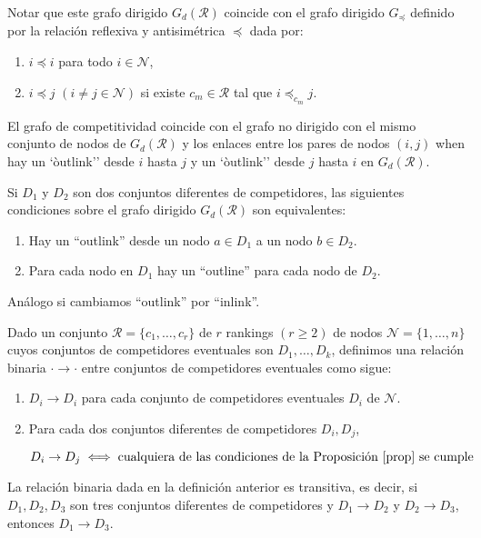 \begin{nota}
Notar que este grafo dirigido $G_d(\mathcal{R})$ coincide con el grafo dirigido $G_\preceq$ definido por la relación reflexiva y antisimétrica $\preceq$ dada por:
\begin{enumerate}
\item $i \preceq i$ para todo $i \in \mathcal{N}$,
\item $i \preceq j$ $(i\neq j \in \mathcal{N})$ si existe $c_m \in \mathcal{R}$ tal que $i \preceq_{c_m} j$. 
\end{enumerate}
El grafo de competitividad coincide con el grafo no dirigido con el mismo conjunto de nodos de $G_d(\mathcal{R})$ y los enlaces entre los pares de nodos $(i,j)$ when hay un `òutlink'' desde $i$ hasta $j$ y un `òutlink'' desde $j$ hasta $i$ en $G_d(\mathcal{R})$. 
\end{nota}

\begin{prop} \label{prop}
Si $D_1$ y $D_2$ son dos conjuntos diferentes de competidores, las siguientes condiciones sobre el grafo dirigido $G_d(\mathcal{R})$ son equivalentes:
\begin{enumerate}
\item Hay un ``outlink'' desde un nodo $a \in D_1$ a un nodo $b \in D_2$.
\item Para cada nodo en $D_1$ hay un ``outline'' para cada nodo de $D_2$.
\end{enumerate}
Análogo si cambiamos ``outlink'' por ``inlink''. 
\end{prop}

\begin{defi} \label{binaria}
Dado un conjunto $\mathcal{R} = \{c_1,\dots, c_r\}$ de $r$ rankings $(r \geq 2)$ de nodos $\mathcal{N} = \{1,\dots,n\}$ cuyos conjuntos de competidores eventuales son $D_1,\dots, D_k$, definimos una relación binaria $\cdot \to \cdot $ entre conjuntos de competidores eventuales como sigue:
\begin{enumerate}
\item $D_i \to D_i$ para cada conjunto de competidores eventuales $D_i$ de $\mathcal{N}$.
\item Para cada dos conjuntos diferentes de competidores $D_i, D_j$,

\[ D_i \to D_j \iff \text{cualquiera de las condiciones de la Proposición \ref{prop} se cumple} \]
\end{enumerate} 
\end{defi}

\begin{lema}
La relación binaria dada en la definición anterior es transitiva, es decir, si $D_1, D_2, D_3$ son tres conjuntos diferentes de competidores y $D_1 \to D_2$ y $D_2 \to D_3$, entonces $D_1 \to D_3$.
\end{lema}

